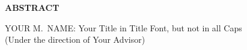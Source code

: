 
\begin{center}
\vspace*{52pt}
{\normalfont\textbf{ABSTRACT}}
\vspace{11pt}

\begin{singlespace}
YOUR M.\ NAME: Your Title in Title Font, but not in all Caps \\
(Under the direction of Your Advisor)
\end{singlespace}
\end{center}

